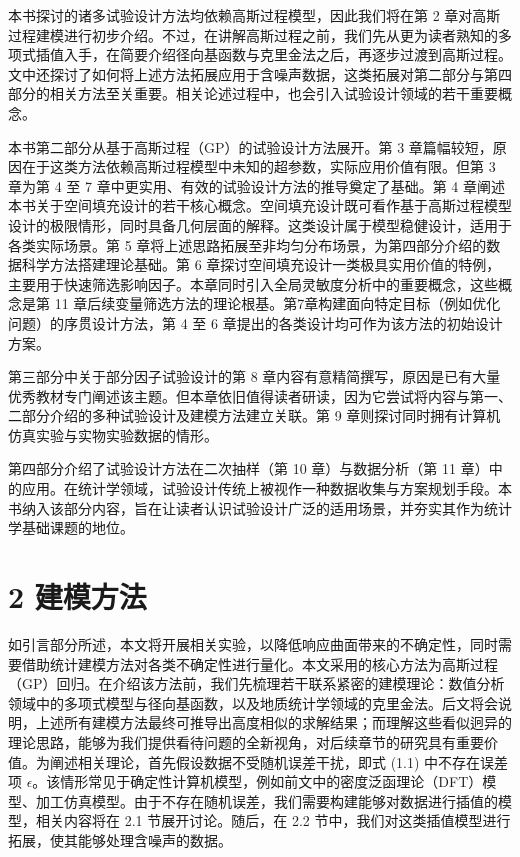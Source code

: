 \documentclass{ctexart}
\begin{document}
本书探讨的诸多试验设计方法均依赖高斯过程模型，因此我们将在第 2 章对高斯过程建模进行初步介绍。不过，在讲解高斯过程之前，我们先从更为读者熟知的多项式插值入手，在简要介绍径向基函数与克里金法之后，再逐步过渡到高斯过程。文中还探讨了如何将上述方法拓展应用于含噪声数据，这类拓展对第二部分与第四部分的相关方法至关重要。相关论述过程中，也会引入试验设计领域的若干重要概念。

本书第二部分从基于高斯过程（GP）的试验设计方法展开。第 3 章篇幅较短，原因在于这类方法依赖高斯过程模型中未知的超参数，实际应用价值有限。但第 3 章为第 4 至 7 章中更实用、有效的试验设计方法的推导奠定了基础。第 4 章阐述本书关于空间填充设计的若干核心概念。空间填充设计既可看作基于高斯过程模型设计的极限情形，同时具备几何层面的解释。这类设计属于模型稳健设计，适用于各类实际场景。第 5 章将上述思路拓展至非均匀分布场景，为第四部分介绍的数据科学方法搭建理论基础。第 6 章探讨空间填充设计一类极具实用价值的特例，主要用于快速筛选影响因子。本章同时引入全局灵敏度分析中的重要概念，这些概念是第 11 章后续变量筛选方法的理论根基。第7章构建面向特定目标（例如优化问题）的序贯设计方法，第 4 至 6 章提出的各类设计均可作为该方法的初始设计方案。

第三部分中关于部分因子试验设计的第 8 章内容有意精简撰写，原因是已有大量优秀教材专门阐述该主题。但本章依旧值得读者研读，因为它尝试将内容与第一、二部分介绍的多种试验设计及建模方法建立关联。第 9 章则探讨同时拥有计算机仿真实验与实物实验数据的情形。

第四部分介绍了试验设计方法在二次抽样（第 10 章）与数据分析（第 11 章）中的应用。在统计学领域，试验设计传统上被视作一种数据收集与方案规划手段。本书纳入该部分内容，旨在让读者认识试验设计广泛的适用场景，并夯实其作为统计学基础课题的地位。

\section*{2 建模方法}

如引言部分所述，本文将开展相关实验，以降低响应曲面带来的不确定性，同时需要借助统计建模方法对各类不确定性进行量化。本文采用的核心方法为高斯过程（GP）回归。在介绍该方法前，我们先梳理若干联系紧密的建模理论：数值分析领域中的多项式模型与径向基函数，以及地质统计学领域的克里金法。后文将会说明，上述所有建模方法最终可推导出高度相似的求解结果；而理解这些看似迥异的理论思路，能够为我们提供看待问题的全新视角，对后续章节的研究具有重要价值。为阐述相关理论，首先假设数据不受随机误差干扰，即式 (1.1) 中不存在误差项 $\epsilon$。该情形常见于确定性计算机模型，例如前文中的密度泛函理论（DFT）模型、加工仿真模型。由于不存在随机误差，我们需要构建能够对数据进行插值的模型，相关内容将在 2.1 节展开讨论。随后，在 2.2 节中，我们对这类插值模型进行拓展，使其能够处理含噪声的数据。
\end{document}
